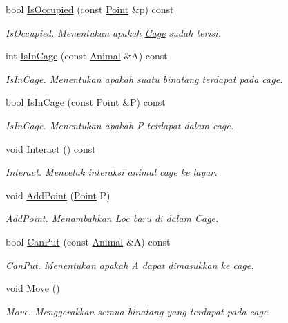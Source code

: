 \begin{DoxyCompactItemize}
bool \hyperlink{classCage_a176fc9feeb9855881e85c5d8551a6443}{Is\+Occupied} (const \hyperlink{classPoint}{Point} \&p) const 
\begin{DoxyCompactList}\small\item\em Is\+Occupied. Menentukan apakah \hyperlink{classCage}{Cage} sudah terisi. \end{DoxyCompactList}\item 
int \hyperlink{classCage_aaf098729df55f3cf45068d32fe6d5c4b}{Is\+In\+Cage} (const \hyperlink{classAnimal}{Animal} \&A) const 
\begin{DoxyCompactList}\small\item\em Is\+In\+Cage. Menentukan apakah suatu binatang terdapat pada cage. \end{DoxyCompactList}\item 
bool \hyperlink{classCage_a2ac9ea442655213ae3d52a6a7dc30fcf}{Is\+In\+Cage} (const \hyperlink{classPoint}{Point} \&P) const 
\begin{DoxyCompactList}\small\item\em Is\+In\+Cage. Menentukan apakah P terdapat dalam cage. \end{DoxyCompactList}\item 
void \hyperlink{classCage_a78f919dc2b8a3e89a7375c97643a2633}{Interact} () const 
\begin{DoxyCompactList}\small\item\em Interact. Mencetak interaksi animal cage ke layar. \end{DoxyCompactList}\item 
void \hyperlink{classCage_aed8ca487fb22db2ca755bc9d784342fc}{Add\+Point} (\hyperlink{classPoint}{Point} P)
\begin{DoxyCompactList}\small\item\em Add\+Point. Menambahkan Loc baru di dalam \hyperlink{classCage}{Cage}. \end{DoxyCompactList}\item 
bool \hyperlink{classCage_aece0c17d0299b55c596eb68175df71a8}{Can\+Put} (const \hyperlink{classAnimal}{Animal} \&A) const 
\begin{DoxyCompactList}\small\item\em Can\+Put. Menentukan apakah A dapat dimasukkan ke cage. \end{DoxyCompactList}\item 
void \hyperlink{classCage_a449f19d08289f70a140955a99769ae4a}{Move} ()
\begin{DoxyCompactList}\small\item\em Move. Menggerakkan semua binatang yang terdapat pada cage. \end{DoxyCompactList}\end{DoxyCompactItemize}


